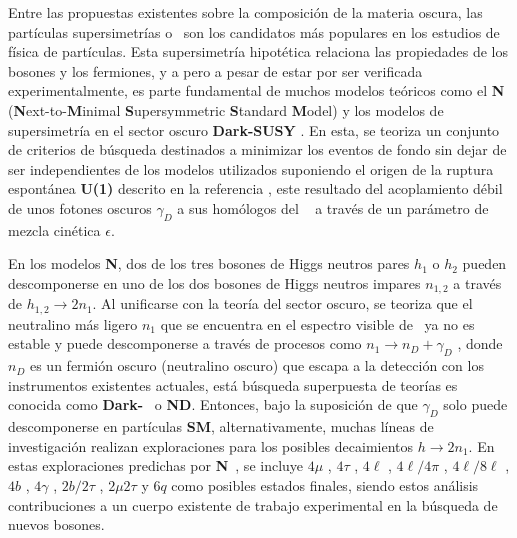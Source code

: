 Entre las propuestas existentes sobre la composición de la materia oscura, las partículas supersimetrías o \SUSY ~son los candidatos más populares en los estudios de física de partículas. Esta supersimetría hipotética relaciona las propiedades de los bosones y los fermiones, y a pero a pesar de estar por ser verificada experimentalmente, es parte fundamental de muchos modelos teóricos como el \textbf{N}\MSSM ~ (\textbf{N}ext-to-\textbf{M}inimal \textbf{S}upersymmetric \textbf{S}tandard \textbf{M}odel) \citep{MSSM_1, MSSM_2} y los modelos de supersimetría en el sector oscuro \textbf{Dark-SUSY} \citep{LB}. En esta, se teoriza un conjunto de criterios de búsqueda destinados a minimizar los eventos de fondo sin dejar de ser independientes de los modelos utilizados suponiendo el origen de la ruptura espontánea \textbf{U(1)} descrito en la referencia \cite{dark_1, dark_2}, este resultado del acoplamiento débil de unos fotones oscuros $\gamma_D$ a sus homólogos del \ME ~ a través de un parámetro de mezcla cinética $\epsilon$. %


En los modelos \textbf{N}\MSSM, dos de los tres bosones de Higgs neutros pares $h_1$ o $h_2$ pueden descomponerse en uno de los dos bosones de Higgs neutros impares $n_{1,2}$ a través de $h_{1,2} \rightarrow  2n_1$. Al unificarse con la teoría del sector oscuro, se teoriza que el neutralino más ligero $n_1$ que se encuentra en el espectro visible de \SUSY ~ya no es estable y puede descomponerse a través de procesos como $n_1  \rightarrow n_D + \gamma_D$ , donde $n_D$ es un fermión oscuro (neutralino oscuro) que escapa a la detección con los instrumentos existentes actuales, está búsqueda superpuesta de teorías es conocida como \textbf{Dark-}\SUSY~ o \textbf{N}\MSSM\textbf{D}. Entonces, bajo la suposición de que $\gamma_D$ solo puede descomponerse en partículas \textbf{SM}, alternativamente, muchas líneas de investigación realizan exploraciones para los posibles decaimientos $h \rightarrow 2n_1$. En estas exploraciones predichas por \textbf{N}\MSSM ~, se incluye $4\mu$ \citep{cms_collaboration_search_2016,cms_collaboration_search_2013}
, $4\tau$ %
, $4\ell$ \citep{cms_collaboration_search_2018,lhcb_collaboration_search_2016}
, $4\ell/4\pi$ \citep{cms_collaboration_search_2018}
, $4\ell/8\ell$ \citep{atlas_collaboration_search_2016-2}
, $4b$ \citep{atlas_collaboration_search_2018-1,atlas_collaboration_search_2016-3}
, $4\gamma$ \citep{atlas_collaboration_search_2014}
, $2b/2\tau$ \citep{atlas_collaboration_search_2018-2}
, $2\mu 2\tau$ \citep{atlas_collaboration_search_2015}
y $6q$ \citep{cms_collaboration_search_2016} 
como posibles estados finales, siendo estos análisis contribuciones a un cuerpo existente de trabajo experimental en la búsqueda de nuevos bosones.

